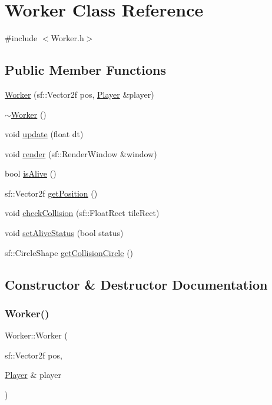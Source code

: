\hypertarget{class_worker}{}\section{Worker Class Reference}
\label{class_worker}


{\ttfamily \#include $<$Worker.\+h$>$}

\subsection*{Public Member Functions}
\begin{DoxyCompactItemize}
\item 
\mbox{\hyperlink{class_worker_aea1f1eb1cabe3f3e5631d8a84f69d893}{Worker}} (sf\+::\+Vector2f pos, \mbox{\hyperlink{class_player}{Player}} \&player)
\item 
\mbox{\hyperlink{class_worker_aa8e4543ef1e93fd9d884269ba30c5bfe}{$\sim$\+Worker}} ()
\item 
void \mbox{\hyperlink{class_worker_aa02e1b87f60d58d1983c1374e0e02785}{update}} (float dt)
\item 
void \mbox{\hyperlink{class_worker_a18940af5e921feefc2373e120d66ff24}{render}} (sf\+::\+Render\+Window \&window)
\item 
bool \mbox{\hyperlink{class_worker_a20d86800eb99f234e606c324a25ca851}{is\+Alive}} ()
\item 
sf\+::\+Vector2f \mbox{\hyperlink{class_worker_a47aa8d5eb21900530255e6a66b7801d9}{get\+Position}} ()
\item 
void \mbox{\hyperlink{class_worker_a10eed5f8fde0691ec9dd9bb3091a0a6f}{check\+Collision}} (sf\+::\+Float\+Rect tile\+Rect)
\item 
void \mbox{\hyperlink{class_worker_a42c38d070074e01ccb554a064bc34212}{set\+Alive\+Status}} (bool status)
\item 
sf\+::\+Circle\+Shape \mbox{\hyperlink{class_worker_abc2c59297e19f8f5fb6f35131a3d2e3a}{get\+Collision\+Circle}} ()
\end{DoxyCompactItemize}


\subsection{Constructor \& Destructor Documentation}
\mbox{\label{class_worker_aea1f1eb1cabe3f3e5631d8a84f69d893}} 
\subsubsection{\texorpdfstring{Worker()}{Worker()}}
{\footnotesize\ttfamily Worker\+::\+Worker (\begin{DoxyParamCaption}\item[{sf\+::\+Vector2f}]{pos,  }\item[{\mbox{\hyperlink{class_player}{Player}} \&}]{player }\end{DoxyParamCaption})}

